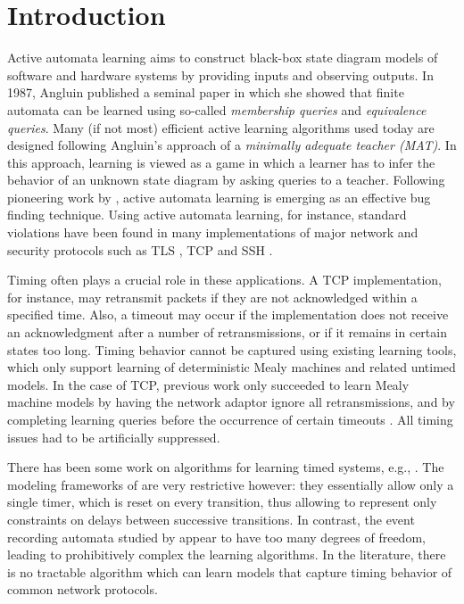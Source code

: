 \section{Introduction}
\label{sec:intro}

Active automata learning aims to construct black-box state diagram models of software and hardware systems
by providing inputs and observing outputs.
In 1987, Angluin \cite{Ang87} published a seminal paper in which she showed that finite automata can be learned using so-called 
\emph{membership queries} and \emph{equivalence queries}.
Many (if not most) efficient active learning algorithms used
today are designed following Angluin's approach of a \emph{minimally adequate teacher (MAT)}.
In this approach, learning is viewed as a game in which a learner has to infer the behavior of
an unknown state diagram by asking queries to a teacher.
Following pioneering work by \cite{Ang87,PeVaYa02,Hagerer2002,RaMeSM2009,IsHoSt2015},
active automata learning is emerging as an effective bug finding technique.
Using active automata learning, for instance, standard violations have been found in many implementations of
major network and security protocols such as TLS \cite{dRP15}, TCP \cite{FJV16,FH17} and SSH \cite{FiterauEtAl17}.

Timing often plays a crucial role in these applications.
A TCP implementation, for instance, may retransmit packets if they are not acknowledged within
a specified time. Also, a timeout may occur if the implementation does not receive an acknowledgment
after a number of retransmissions, or if it remains in certain states too long.
Timing behavior cannot be captured using existing learning tools, which only support learning of deterministic
Mealy machines and related untimed models.
In the case of TCP, previous work only succeeded to learn Mealy machine models by having the network adaptor 
ignore all retransmissions, and by completing learning queries before the occurrence of certain timeouts \cite{FJV16}.
All timing issues had to be artificially suppressed.

There has been some work on algorithms for learning timed systems, e.g., \cite{GrinchteinJP06,GrinchteinJL10,CCF16,VWW:rti}.
The modeling frameworks of \cite{VWW:rti,CCF16} are very restrictive however: they essentially allow only a single timer, which is reset on every transition,
thus allowing to represent only constraints on delays between successive transitions. In contrast, the event recording automata studied by \cite{GrinchteinJP06,GrinchteinJL10} appear to have too many degrees of freedom, leading to
prohibitively complex the learning algorithms.
In the literature, there is no tractable algorithm which can learn models that
capture timing behavior of common network protocols.

